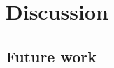 \documentclass[final,3p,times,twocolumn]{elsarticle}
\begin{document}
%


\section{Discussion}

\subsection{Future work}
\end{document}

